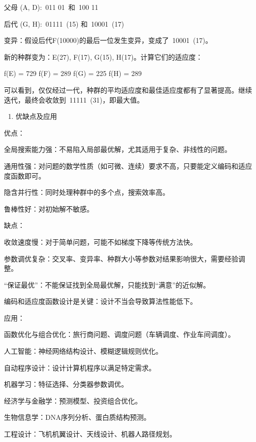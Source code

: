 父母 (A, D):~011 \textbar{} 01~和~100 \textbar{} 11

后代 (G, H):~01111~(15) 和~10001~(17)

变异：假设后代F(10000)的最后一位发生变异，变成了~10001~(17)。

新的种群变为：E(27), F(17), G(15), H(17)。计算它们的适应度：

f(E) = 729 f(F) = 289 f(G) = 225 f(H) = 289

可以看到，仅仅经过一代，种群的平均适应度和最佳适应度都有了显著提高。继续迭代，最终会收敛到~11111~(31)，即最大值。

\begin{enumerate}
\def\labelenumi{\arabic{enumi}.}
\setcounter{enumi}{3}
\tightlist
\item
  优缺点及应用
\end{enumerate}

优点：

全局搜索能力强：不易陷入局部最优解，尤其适用于复杂、非线性的问题。

通用性强：对问题的数学性质（如可微、连续）要求不高，只要能定义编码和适应度函数即可。

隐含并行性：同时处理种群中的多个点，搜索效率高。

鲁棒性好：对初始解不敏感。

缺点：

收敛速度慢：对于简单问题，可能不如梯度下降等传统方法快。

参数调优复杂：交叉率、变异率、种群大小等参数对结果影响很大，需要经验调整。

``保证最优''：不能保证找到全局最优解，只能找到``满意''的近似解。

编码和适应度函数设计是关键：设计不当会导致算法性能低下。

应用：

函数优化与组合优化：旅行商问题、调度问题（车辆调度、作业车间调度）。

人工智能：神经网络结构设计、模糊逻辑规则优化。

自动程序设计：设计计算机程序以满足特定需求。

机器学习：特征选择、分类器参数调优。

经济学与金融学：预测模型、投资组合优化。

生物信息学：DNA序列分析、蛋白质结构预测。

工程设计：飞机机翼设计、天线设计、机器人路径规划。

